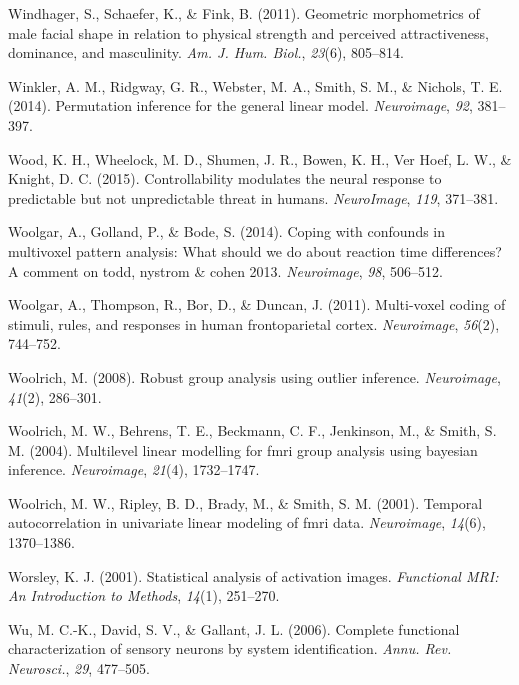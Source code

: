\documentclass[11pt,american,]{memoir} %
\begin{document}
\leavevmode\hypertarget{ref-Windhager2011-ik}{}%
Windhager, S., Schaefer, K., \& Fink, B. (2011). Geometric morphometrics of male facial shape in relation to physical strength and perceived attractiveness, dominance, and masculinity. \emph{Am. J. Hum. Biol.}, \emph{23}(6), 805--814.

\leavevmode\hypertarget{ref-winkler2014permutation}{}%
Winkler, A. M., Ridgway, G. R., Webster, M. A., Smith, S. M., \& Nichols, T. E. (2014). Permutation inference for the general linear model. \emph{Neuroimage}, \emph{92}, 381--397.

\leavevmode\hypertarget{ref-wood2015controllability}{}%
Wood, K. H., Wheelock, M. D., Shumen, J. R., Bowen, K. H., Ver Hoef, L. W., \& Knight, D. C. (2015). Controllability modulates the neural response to predictable but not unpredictable threat in humans. \emph{NeuroImage}, \emph{119}, 371--381.

\leavevmode\hypertarget{ref-Woolgar2014-jb}{}%
Woolgar, A., Golland, P., \& Bode, S. (2014). Coping with confounds in multivoxel pattern analysis: What should we do about reaction time differences? A comment on todd, nystrom \& cohen 2013. \emph{Neuroimage}, \emph{98}, 506--512.

\leavevmode\hypertarget{ref-woolgar2011multi}{}%
Woolgar, A., Thompson, R., Bor, D., \& Duncan, J. (2011). Multi-voxel coding of stimuli, rules, and responses in human frontoparietal cortex. \emph{Neuroimage}, \emph{56}(2), 744--752.

\leavevmode\hypertarget{ref-woolrich2008robust}{}%
Woolrich, M. (2008). Robust group analysis using outlier inference. \emph{Neuroimage}, \emph{41}(2), 286--301.

\leavevmode\hypertarget{ref-woolrich2004multilevel}{}%
Woolrich, M. W., Behrens, T. E., Beckmann, C. F., Jenkinson, M., \& Smith, S. M. (2004). Multilevel linear modelling for fmri group analysis using bayesian inference. \emph{Neuroimage}, \emph{21}(4), 1732--1747.

\leavevmode\hypertarget{ref-woolrich2001temporal}{}%
Woolrich, M. W., Ripley, B. D., Brady, M., \& Smith, S. M. (2001). Temporal autocorrelation in univariate linear modeling of fmri data. \emph{Neuroimage}, \emph{14}(6), 1370--1386.

\leavevmode\hypertarget{ref-worsley2001statistical}{}%
Worsley, K. J. (2001). Statistical analysis of activation images. \emph{Functional MRI: An Introduction to Methods}, \emph{14}(1), 251--270.

\leavevmode\hypertarget{ref-Wu2006-qs}{}%
Wu, M. C.-K., David, S. V., \& Gallant, J. L. (2006). Complete functional characterization of sensory neurons by system identification. \emph{Annu. Rev. Neurosci.}, \emph{29}, 477--505.
\end{document}
